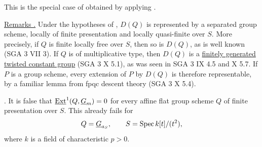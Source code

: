 This is the special case of  obtained by applying .

\medskip
\noindent\underline{Remarks .}  Under the hypotheses of ,
$D(Q)$ is represented by a separated group scheme, locally of finite
presentation and locally quasi-finite over $S$.  More precisely, if
$Q$ is finite locally free over $S$, then so is $D(Q)$, as is well
known (SGA 3 VII 3).  If $Q$ is of multiplicative type, then $D(Q)$
is a \underline{finitely generated twisted constant group} (SGA 3 X
5.1), as was seen in SGA 3 IX 4.5 and X 5.7.  If $P$ is a group
scheme, every extension of $P$ by $D(Q)$ is therefore representable,
by a familiar lemma from fpqc descent theory (SGA 3 X 5.4).

\medskip
\noindent {}.  It is false that
$\uExt^1(Q,\underline G_m)=0$ for every affine flat group scheme $Q$
of finite presentation over $S$.  This already fails for
\[
 Q=\underline G_{a_S},\qquad
 S=\Spec k[t]/(t^2),
\]
where $k$ is a field of characteristic $p>0$.

